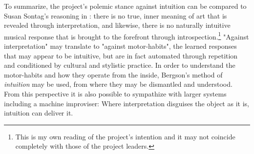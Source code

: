 \documentclass[11pt]{article}
\begin{document}
To summarize, the project's polemic stance against intuition can be compared to Susan Sontag's reasoning in : there is no true, inner meaning of art that is revealed through interpretation, and likewise, there is no naturally intuitive musical response that is brought to the forefront through introspection.\footnote{This is my own reading of the project's intention and it may not coincide completely with those of the project leaders.} "Against interpretation" may translate to "against motor-habits", the learned responses that may appear to be intuitive, but are in fact automated through repetition and conditioned by cultural and stylistic practice. In order to understand the motor-habits and how they operate from the inside, Bergson's method of \emph{intuition} may be used, from where they may be dismantled and understood. From this perspective it is also possible to sympathize with larger systems including a machine improviser: Where interpretation disguises the object as it is, intuition can deliver it.
\end{document}
